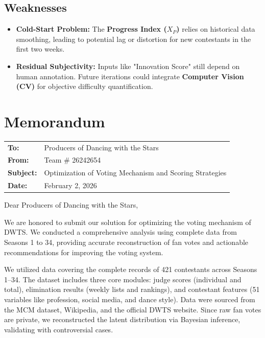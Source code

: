 \documentclass{mcmthesis}
\begin{document}
\subsection{Weaknesses}
\begin{itemize}
	\setlength{\itemsep}{0pt}
	\setlength{\parskip}{0pt}
	\item \textbf{Cold-Start Problem:} The \textbf{Progress Index ($X_P$)} relies on historical data smoothing, leading to potential lag or distortion for new contestants in the first two weeks.
	\item \textbf{Residual Subjectivity:} Inputs like "Innovation Score" still depend on human annotation. Future iterations could integrate \textbf{Computer Vision (CV)} for objective difficulty quantification.
\end{itemize}

\newpage
\section{Memorandum}
\noindent
\setlength{\tabcolsep}{0pt}
\begin{tabularx}{\linewidth}{@{}>{\bfseries}l@{\ }X@{}}
	To:      & Producers of Dancing with the Stars\\
	From:    & Team \# 26242654\\
	Subject: & Optimization of Voting Mechanism and Scoring Strategies\\
	Date:    & February 2, 2026\\
\end{tabularx}

\vspace{6pt}
\noindent Dear Producers of Dancing with the Stars,

We are honored to submit our solution for optimizing the voting mechanism of DWTS. We conducted a comprehensive analysis using complete data from Seasons 1 to 34, providing accurate reconstruction of fan votes and actionable recommendations for improving the voting system.

We utilized data covering the complete records of 421 contestants across Seasons 1–34. The dataset includes three core modules: judge scores (individual and total), elimination results (weekly lists and rankings), and contestant features (51 variables like profession, social media, and dance style). Data were sourced from the MCM dataset, Wikipedia, and the official DWTS website. Since raw fan votes are private, we reconstructed the latent distribution via Bayesian inference, validating with controversial cases.
\end{document}
